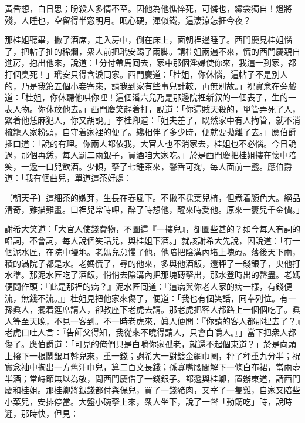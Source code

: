 \begin{myquote}[\markfont]
黃昏想，白日思；盼殺人多情不至。因他為他憔悴死，可憐也，繡衾獨自！燈將殘，人睡也，空留得半窓明月。眠心硬，渾似鐵，這淒涼怎捱今夜？

\end{myquote}

那桂姐聽畢，撇了酒席，走入房中，倒在床上，面朝裡邊睡了。{}西門慶見桂姐惱了，把帖子扯的稀爛，衆人前把玳安踢了兩脚。{}請桂姐兩遍不來，慌的西門慶親自進房，抱出他來，說道：「分付帶馬囘去，家中那個淫婦使你來，我這一到家，都打個臭死！」玳安只得含淚囘家。西門慶道：「桂姐，你休惱，這帖子不是別人的，乃是我第五個小妾寄來，請我到家有些事兒計較，再無別故。」祝實念在旁戲道：「桂姐，你休聽他哄你哩！這個潘六兒乃是那邊院裡新叙的一個表子，生的一表人物。你休放他去。」西門慶笑趕着打，說道：「你這賊天殺的，單管弄死了人，緊着他恁麻犯人，你又胡說。」{}李桂卿道：「姐夫差了，既然家中有人拘管，就不消梳籠人家粉頭，自守着家裡的便了。{}纔相伴了多少時，便就要拋離了去。」{}應伯爵插口道：「說的有理。你兩人都依我，大官人也不消家去，桂姐也不必惱。今日說過，那個再恁，每人罰二兩銀子，買酒咱大家吃。」於是西門慶把桂姐摟在懷中陪笑，一遞一口兒飲酒。少傾，拏了七鍾茶來，馨香可掬，每人面前一盞。應伯爵道：「我有個曲兒，單道這茶好處：

\begin{myquote}
{\markfont\small〔朝天子〕}這細茶的嫩芽，生長在春風下。不揪不採葉兒楂，但煮着顏色大。絕品清奇，難描難畫。口裡兒常時呷，醉了時想他，醒來時愛他。{}原來一簍兒千金價。」
\end{myquote}

謝希大笑道：「大官人使錢費物，不圖這『一摟兒』，{}卻圖些甚的？如今每人有詞的唱詞，不會詞，每人說個笑話兒，與桂姐下酒。」就該謝希大先說，因說道：「有一個泥水匠，在院中墁地。老媽兒怠慢了他，他暗把陰溝內堵上塊磚。落後天下雨，積的滿院子都是水。老媽慌了，尋的他來，多與他酒飯，還秤了一錢銀子，央他打水準。那泥水匠吃了酒飯，悄悄去陰溝內把那塊磚拏出，那水登時出的罄盡。老媽便問作頭：『此是那裡的病？』泥水匠囘道：『這病與你老人家的病一樣，有錢便流，無錢不流。』」桂姐見把他家來傷了，便道：「我也有個笑話，囘奉列位。有一孫眞人，擺着筵席請人，卻教座下老虎去請。那老虎把客人都路上一個個吃了。眞人等至天晚，不見一客到。不一時老虎來，眞人便問：『你請的客人都那裡去了？』老虎口吐人言：{}『告師父得知，我從來不曉得請人，只會白嚼人。』」當下把衆人都傷了。應伯爵道：「可見的俺們只是白嚼你家孤老，就還不起個東道？」於是向頭上撥下一根鬧銀耳斡兒來，重一錢；謝希大一對鍍金網巾圈，秤了秤重九分半；祝實念袖中掏出一方舊汗巾兒，算二百文長錢；{}孫寡嘴腰間解下一條白布裙，{}當兩壺半酒；常峙節無以為敬，問西門慶借了一錢銀子。都遞與桂卿，置辦東道，請西門慶和桂姐。那桂卿將銀錢都付與保兒，買了一錢豬肉，又宰了一隻雞，自家又陪些小菜兒，{}安排停當。大盤小碗拏上來，衆人坐下，說了一聲「動筯吃」時，說時遲，那時快，但見：


